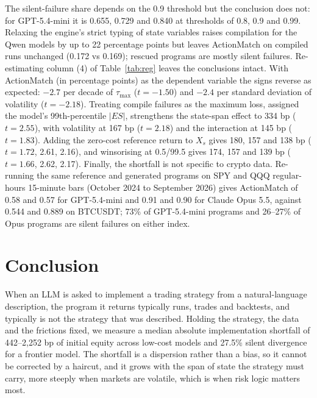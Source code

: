 \documentclass[a4paper,fleqn]{cas-sc}
\begin{document}
The silent-failure share depends on the 0.9 threshold but the conclusion does not: for GPT-5.4-mini it is 0.655, 0.729 and 0.840 at thresholds of 0.8, 0.9 and 0.99. Relaxing the engine's strict typing of state variables raises compilation for the Qwen models by up to 22 percentage points but leaves ActionMatch on compiled runs unchanged (0.172 vs 0.169); rescued programs are mostly silent failures. Re-estimating column (4) of Table~\ref{tab:reg} leaves the conclusions intact. With ActionMatch (in percentage points) as the dependent variable the signs reverse as expected: $-2.7$ per decade of $\tau_{\max}$ ($t=-1.50$) and $-2.4$ per standard deviation of volatility ($t=-2.18$). Treating compile failures as the maximum loss, assigned the model's 99th-percentile $|ES|$, strengthens the state-span effect to 334 bp ($t=2.55$), with volatility at 167 bp ($t=2.18$) and the interaction at 145 bp ($t=1.83$). Adding the zero-cost reference return to $X_s$ gives 180, 157 and 138 bp ($t=1.72$, 2.61, 2.16), and winsorising at 0.5/99.5 gives 174, 157 and 139 bp ($t=1.66$, 2.62, 2.17). Finally, the shortfall is not specific to crypto data. Re-running the same reference and generated programs on SPY and QQQ regular-hours 15-minute bars (October 2024 to September 2026) gives ActionMatch of 0.58 and 0.57 for GPT-5.4-mini and 0.91 and 0.90 for Claude Opus 5.5, against 0.544 and 0.889 on BTCUSDT; 73\% of GPT-5.4-mini programs and 26--27\% of Opus programs are silent failures on either index.

\section{Conclusion}

When an LLM is asked to implement a trading strategy from a natural-language description, the program it returns typically runs, trades and backtests, and typically is not the strategy that was described. Holding the strategy, the data and the frictions fixed, we measure a median absolute implementation shortfall of 442--2{,}252 bp of initial equity across low-cost models and 27.5\% silent divergence for a frontier model. The shortfall is a dispersion rather than a bias, so it cannot be corrected by a haircut, and it grows with the span of state the strategy must carry, more steeply when markets are volatile, which is when risk logic matters most.
\end{document}
